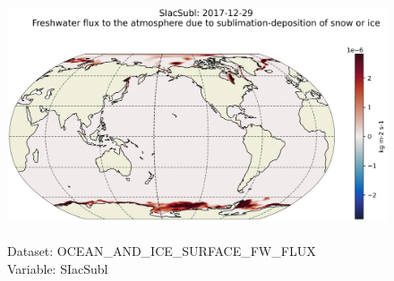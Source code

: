 \begin{figure}[H]
\centering
\includegraphics[scale=0.5]{../images/plots/latlon_plots/Ocean_and_Sea-Ice_Surface_Freshwater_Fluxes/SIacSubl.png}
\caption{\\Dataset: OCEAN\_AND\_ICE\_SURFACE\_FW\_FLUX\\Variable: SIacSubl}
\label{tab:table-OCEAN_AND_ICE_SURFACE_FW_FLUX_SIacSubl-Plot}
\end{figure}
\pagebreak
